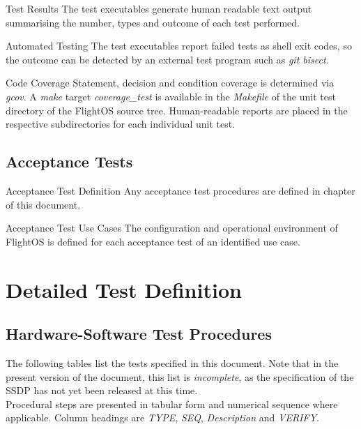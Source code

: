 {Test Results}{%
The test executables generate human readable text output summarising the number,
types and outcome of each test performed.
}%
{}{}


{\hspace{0pt} Automated Testing}{%
The test executables report failed tests as shell exit codes, so the outcome
can be detected by an external test program such as \emph{git bisect}.
}%
{}{}


{Code Coverage}{%
Statement, decision and condition coverage is determined via \emph{gcov}.
A \emph{make} target \emph{coverage\_test} is available in the \emph{Makefile}
of the unit test directory of the FlightOS source tree.
Human-readable reports are placed in the respective subdirectories for each
individual unit test.
}%
{}{}


\section{Acceptance Tests}

{\hspace{0pt} Acceptance Test Definition}{%
Any acceptance test procedures are defined in chapter
\mbox{} of this document.
}%
{}{}

{\hspace{0pt} Acceptance Test Use Cases}{%
The configuration and operational environment of FlightOS is defined for each
acceptance test of an identified use case.
}%
{}{}


\chapter{Detailed Test Definition}
\label{detailedtestdefinitions}

\section{Hardware-Software Test Procedures}
The following tables list the tests specified in this document. Note that in
the present version of the document, this list is \emph{incomplete}, as the
specification of the \gls{SSDP} has not yet been released at this time.\\

\noindent
Procedural steps are presented in tabular form and numerical sequence where
applicable. Column headings are \emph{TYPE}, \emph{SEQ}, \emph{Description}
and \emph{VERIFY}.\\

